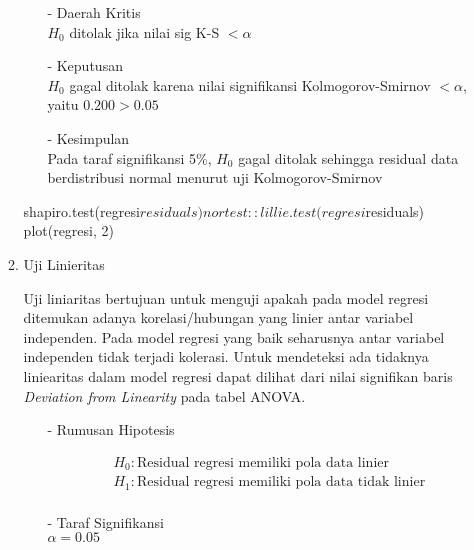 \begin{enumerate}
\begin{enumerate}
\begin{test}
{\begin{enumerate}
            \item[-] Daerah Kritis \\
            $H_0$ ditolak jika nilai sig K-S $< \alpha$
        
            \item[-] Keputusan \\
            $H_0$ gagal ditolak karena nilai signifikansi Kolmogorov-Smirnov $< \alpha$, yaitu $0.200 > 0.05$
        
            \item[-] Kesimpulan \\
            Pada taraf signifikansi 5\%, $H_0$ gagal ditolak sehingga residual data berdistribusi normal menurut uji Kolmogorov-Smirnov
        \end{enumerate}
        }
shapiro.test(regresi$residuals)
nortest::lillie.test(regresi$residuals)
plot(regresi, 2)
        \end{test}

    \item Uji Linieritas \\
    \begin{sloppypar}
    Uji liniaritas bertujuan untuk menguji apakah pada model regresi ditemukan adanya korelasi/hubungan yang linier antar variabel independen. Pada model regresi yang baik seharusnya antar variabel independen tidak terjadi kolerasi. Untuk mendeteksi ada tidaknya liniearitas dalam model regresi dapat dilihat dari nilai signifikan baris \textit{Deviation from Linearity} pada tabel ANOVA.
    \end{sloppypar}
        \begin{test}{
            \begin{enumerate}
            \item[-] Rumusan Hipotesis \\
            \begin{fleqn}[\parindent]
                \begin{equation*}
                \begin{split}
                &H_0 : \text{Residual regresi memiliki pola data linier} \\ 
                &H_1 : \text{Residual regresi memiliki pola data tidak linier} \\
                \end{split}
                \end{equation*}
            \end{fleqn}
        
            \item[-] Taraf Signifikansi \\
            $\alpha = 0.05$
        

\end{enumerate}}
\end{test}
\end{enumerate}
\end{enumerate}
